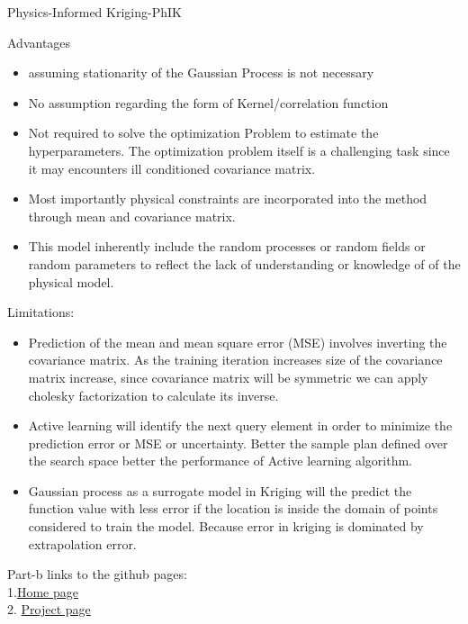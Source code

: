 \documentclass[a4sheet,12pt]{article}
\numberwithin{equation}{section}
\theoremstyle{remark}
\begin{document}
\begin{section}{Physics-Informed Kriging-PhIK}
\begin{subsection}{Advantages}
\begin{itemize}
    \item assuming stationarity of the Gaussian Process is not necessary 
    \item No assumption regarding the form of Kernel/correlation function
    \item Not required to solve the optimization Problem to estimate the hyperparameters. The optimization problem itself is a challenging task since it may encounters ill conditioned covariance matrix.
    \item Most importantly physical constraints are incorporated into the method through mean and covariance matrix.
    \item This model inherently include the random processes or random fields or random parameters to reflect the lack of understanding or knowledge of of the physical model.
\end{itemize}
\end{subsection}
\begin{subsection}{Limitations:}
\begin{itemize}
    \item Prediction of the mean and mean square error (MSE) involves inverting the covariance matrix. As the training iteration increases size of the covariance matrix increase, since covariance matrix will be symmetric we can apply cholesky factorization to calculate its inverse.
    \item Active learning will identify the next query element in order to minimize the prediction error or MSE or uncertainty. Better the sample plan defined over the search space better the performance of Active learning algorithm.
    \item Gaussian process as a surrogate model in Kriging will the predict the function value with less error if the location is inside the domain of points considered to train the model. Because error in kriging is dominated by extrapolation error. 
\end{itemize}
\newpage
\end{subsection}
\begin{section}{Part-b}
links to the github pages:\\
1.\href{https://sumanthk94.github.io}{Home page}\\
2. \href{https://sumanthk94.github.io/sumanthk94.github.io-prj/}{Project page}
\end{section}
\end{section}
\printbibliography
\end{document}
